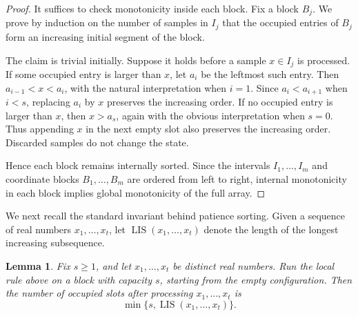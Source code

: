 \documentclass[11pt,reqno,letterpaper]{amsart}
\newtheorem{lemma}[theorem]{Lemma}
\theoremstyle{definition}
\numberwithin{equation}{section}
\DeclareMathOperator{\LIS}{LIS}
\begin{document}
\begin{proof}
It suffices to check monotonicity inside each block.  Fix a block \(B_j\).  We prove by induction on the number of samples in $I_j$ that the occupied
entries of \(B_j\) form an increasing initial segment of the block.

The claim is trivial initially.  Suppose it holds before a sample \(x\in I_j\) is processed.  If some occupied entry is larger than \(x\), let \(a_i\) be the leftmost such entry.  Then \(a_{i-1}<x<a_i\), with the natural interpretation when \(i=1\).  Since \(a_i<a_{i+1}\) when \(i<s\), replacing \(a_i\) by \(x\) preserves the increasing order.  If no occupied entry is larger than \(x\), then \(x>a_s\), again with the obvious interpretation when \(s=0\).  Thus appending \(x\) in the next empty slot also preserves the increasing order.  Discarded samples do not change the state.

Hence each block remains internally sorted.  Since the intervals \(I_1,\dots,I_m\) and coordinate blocks \(B_1,\dots,B_m\) are ordered from left to right, internal monotonicity in each block implies global monotonicity of the full array.
\end{proof}

We next recall the standard invariant behind patience sorting. Given a sequence of real numbers \(x_1,\dots,x_t\), let \(\LIS(x_1,\dots,x_t)\) denote the length of the longest increasing subsequence.

\begin{lemma}\label{lem:truncated-patience}
Fix \(s\ge1\), and let \(x_1,\dots,x_t\) be distinct real numbers. Run the local rule above on a block with  capacity \(s\), starting from the empty configuration. Then the number of occupied slots after processing \(x_1,\dots,x_t\) is
\[
\min\{s,\LIS(x_1,\dots,x_t)\}.
\]
\end{lemma}
\end{document}
